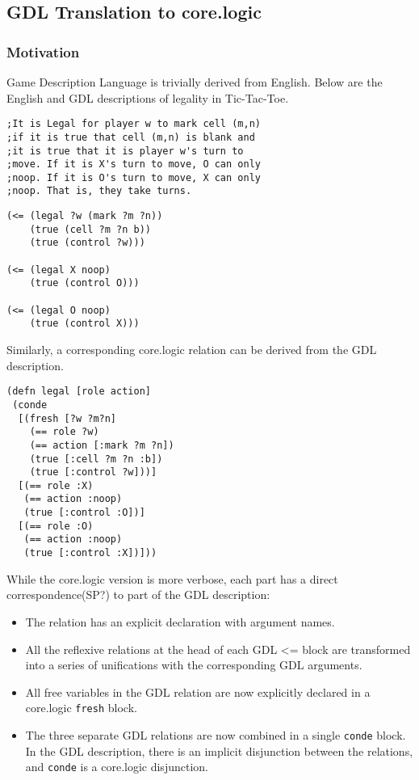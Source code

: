 \documentclass[letterpaper]{article}
\begin{document}
\subsection{GDL Translation to core.logic}
\subsubsection{Motivation}
Game Description Language is trivially derived from English. Below are the English and GDL descriptions of legality in Tic-Tac-Toe.
\begin{lstlisting}[frame=single, caption=The Legal relation for Tic-Tac-Toe expressed in English]
;It is Legal for player w to mark cell (m,n)
;if it is true that cell (m,n) is blank and
;it is true that it is player w's turn to
;move. If it is X's turn to move, O can only
;noop. If it is O's turn to move, X can only
;noop. That is, they take turns. 
\end{lstlisting}
\begin{lstlisting}[frame=single, caption=The Legal relation for Tic-Tac-Toe expressed in GDL]
(<= (legal ?w (mark ?m ?n))
    (true (cell ?m ?n b))
    (true (control ?w)))

(<= (legal X noop)
    (true (control O)))

(<= (legal O noop)
    (true (control X)))
\end{lstlisting}

Similarly, a corresponding core.logic relation can be derived from the GDL description.

\begin{lstlisting}[frame=single, caption=The Legal relation translated into core.logic]
(defn legal [role action]
 (conde
  [(fresh [?w ?m?n]
    (== role ?w)
    (== action [:mark ?m ?n])
    (true [:cell ?m ?n :b])
    (true [:control ?w]))]
  [(== role :X)
   (== action :noop)
   (true [:control :O])]
  [(== role :O)
   (== action :noop)
   (true [:control :X])]))
\end{lstlisting}

While the core.logic version is more verbose, each part has a direct correspondence(SP?) to part of the GDL description:
\begin{itemize}
\item The relation has an explicit declaration with argument names.
\item All the reflexive relations at the head of each GDL \textless= block are transformed into a series of unifications with the corresponding GDL arguments. 
\item All free variables in the GDL relation are now explicitly declared in a core.logic \texttt{fresh} block.
\item The three separate GDL relations are now combined in a single \texttt{conde} block. In the GDL description, there is an implicit disjunction between the relations, and \texttt{conde} is a core.logic disjunction.
\end{itemize}
\end{document}
